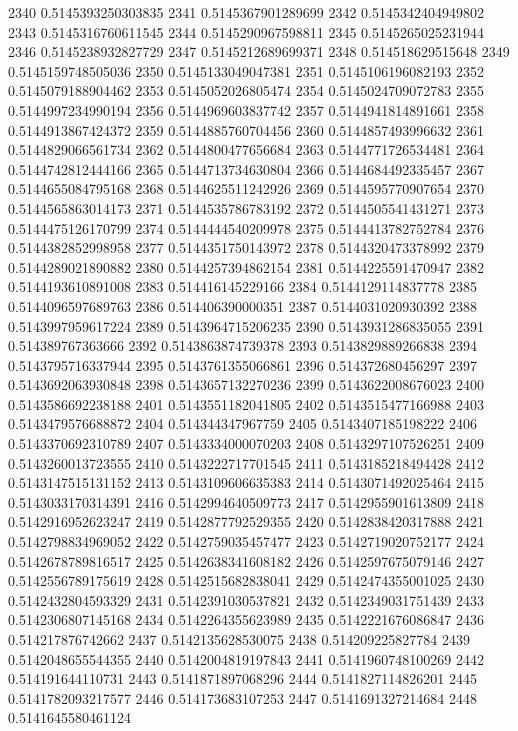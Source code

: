 2340 0.5145393250303835
2341 0.5145367901289699
2342 0.5145342404949802
2343 0.5145316760611545
2344 0.5145290967598811
2345 0.5145265025231944
2346 0.5145238932827729
2347 0.5145212689699371
2348 0.514518629515648
2349 0.5145159748505036
2350 0.5145133049047381
2351 0.5145106196082193
2352 0.5145079188904462
2353 0.5145052026805474
2354 0.5145024709072783
2355 0.5144997234990194
2356 0.5144969603837742
2357 0.5144941814891661
2358 0.5144913867424372
2359 0.5144885760704456
2360 0.5144857493996632
2361 0.5144829066561734
2362 0.5144800477656684
2363 0.5144771726534481
2364 0.5144742812444166
2365 0.5144713734630804
2366 0.5144684492335457
2367 0.5144655084795168
2368 0.5144625511242926
2369 0.5144595770907654
2370 0.5144565863014173
2371 0.5144535786783192
2372 0.5144505541431271
2373 0.5144475126170799
2374 0.5144444540209978
2375 0.5144413782752784
2376 0.5144382852998958
2377 0.5144351750143972
2378 0.5144320473378992
2379 0.5144289021890882
2380 0.5144257394862154
2381 0.5144225591470947
2382 0.5144193610891008
2383 0.514416145229166
2384 0.5144129114837778
2385 0.5144096597689763
2386 0.514406390000351
2387 0.5144031020930392
2388 0.5143997959617224
2389 0.5143964715206235
2390 0.5143931286835055
2391 0.514389767363666
2392 0.5143863874739378
2393 0.5143829889266838
2394 0.5143795716337944
2395 0.5143761355066861
2396 0.514372680456297
2397 0.5143692063930848
2398 0.5143657132270236
2399 0.5143622008676023
2400 0.5143586692238188
2401 0.5143551182041805
2402 0.5143515477166988
2403 0.5143479576688872
2404 0.514344347967759
2405 0.5143407185198222
2406 0.5143370692310789
2407 0.5143334000070203
2408 0.5143297107526251
2409 0.5143260013723555
2410 0.5143222717701545
2411 0.5143185218494428
2412 0.5143147515131152
2413 0.5143109606635383
2414 0.5143071492025464
2415 0.5143033170314391
2416 0.5142994640509773
2417 0.5142955901613809
2418 0.5142916952623247
2419 0.5142877792529355
2420 0.5142838420317888
2421 0.5142798834969052
2422 0.5142759035457477
2423 0.5142719020752177
2424 0.5142678789816517
2425 0.5142638341608182
2426 0.5142597675079146
2427 0.5142556789175619
2428 0.5142515682838041
2429 0.5142474355001025
2430 0.5142432804593329
2431 0.5142391030537821
2432 0.5142349031751439
2433 0.5142306807145168
2434 0.5142264355623989
2435 0.5142221676086847
2436 0.514217876742662
2437 0.5142135628530075
2438 0.514209225827784
2439 0.5142048655544355
2440 0.5142004819197843
2441 0.5141960748100269
2442 0.514191644110731
2443 0.5141871897068296
2444 0.5141827114826201
2445 0.5141782093217577
2446 0.514173683107253
2447 0.5141691327214684
2448 0.5141645580461124

